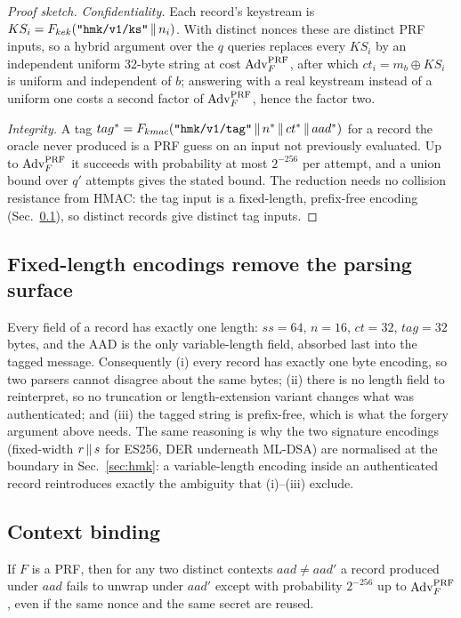\begin{proof}[Proof sketch]
\emph{Confidentiality.} Each record's keystream is
$KS_i = F_{kek}(\texttt{"hmk/v1/ks"} \,\|\, n_i)$. With distinct nonces these
are distinct PRF inputs, so a hybrid argument over the $q$ queries replaces
every $KS_i$ by an independent uniform 32-byte string at cost
$\mathrm{Adv}^{\mathrm{PRF}}_{F}$, after which $ct_i = m_b \oplus KS_i$ is uniform and
independent of $b$; answering with a real keystream instead of a uniform one
costs a second factor of $\mathrm{Adv}^{\mathrm{PRF}}_{F}$, hence the factor two.

\emph{Integrity.} A tag
$tag^\ast = F_{kmac}(\texttt{"hmk/v1/tag"} \,\|\, n^\ast \,\|\, ct^\ast
\,\|\, aad^\ast)$ for a record the oracle never produced is a PRF guess on an
input not previously evaluated. Up to $\mathrm{Adv}^{\mathrm{PRF}}_{F}$ it succeeds with
probability at most $2^{-256}$ per attempt, and a union bound over $q'$
attempts gives the stated bound. The reduction needs no collision resistance
from HMAC: the tag input is a fixed-length, prefix-free encoding
(Sec.~\ref{sec:enc}), so distinct records give distinct tag inputs.
\end{proof}

\subsection{Fixed-length encodings remove the parsing surface}
\label{sec:enc}

Every field of a record has exactly one length: $ss=64$, $n=16$, $ct=32$,
$tag=32$ bytes, and the AAD is the only variable-length field, absorbed last
into the tagged message. Consequently (i) every record has exactly one byte
encoding, so two parsers cannot disagree about the same bytes; (ii) there is no
length field to reinterpret, so no truncation or length-extension variant
changes what was authenticated; and (iii) the tagged string is prefix-free,
which is what the forgery argument above needs. The same reasoning is why the
two signature encodings (fixed-width $r \,\|\, s$ for ES256, DER underneath
ML-DSA) are normalised at the boundary in Sec.~\ref{sec:hmk}: a
variable-length encoding inside an authenticated record reintroduces exactly
the ambiguity that (i)--(iii) exclude.

\subsection{Context binding}
\label{sec:aad}

\begin{theorem}
\label{thm:ctx}
If $F$ is a PRF, then for any two distinct contexts $aad \neq aad'$ a record
produced under $aad$ fails to unwrap under $aad'$ except with probability
$2^{-256}$ up to $\mathrm{Adv}^{\mathrm{PRF}}_{F}$, even if the same nonce and the same
secret are reused.
\end{theorem}

